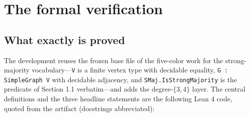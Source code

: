 \documentclass[11pt]{article}
\theoremstyle{definition}
\theoremstyle{remark}
\begin{document}
\section{The formal verification}\label{3-the-formal-verification}

\subsection{What exactly is proved}\label{31-what-is-proved}

The development reuses the frozen base file of the five-color work \cite{E5} for the strong-majority vocabulary---\texttt{V} is a finite vertex type with decidable equality, \texttt{G : SimpleGraph V} with decidable adjacency, and \texttt{SMaj.IsStrongMajority} is the predicate of Section 1.1 verbatim---and adds the degree-$\{3,4\}$ layer. The central definitions and the three headline statements are the following Lean 4 code, quoted from the artifact (docstrings abbreviated):
\end{document}
